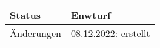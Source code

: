 \begin{table}[H]
\begin{tabularx}{\textwidth}{| l | X |}
        \hline
        Status          & Enwturf                                                                                                                                                                                                                                                                                                                                                                                              \\
        \hline
        Änderungen      & 08.12.2022: erstellt                                                                                                                                                                                                                                                                                                                                                                                 \\
        \hline
    \end{tabularx}
\end{table}


